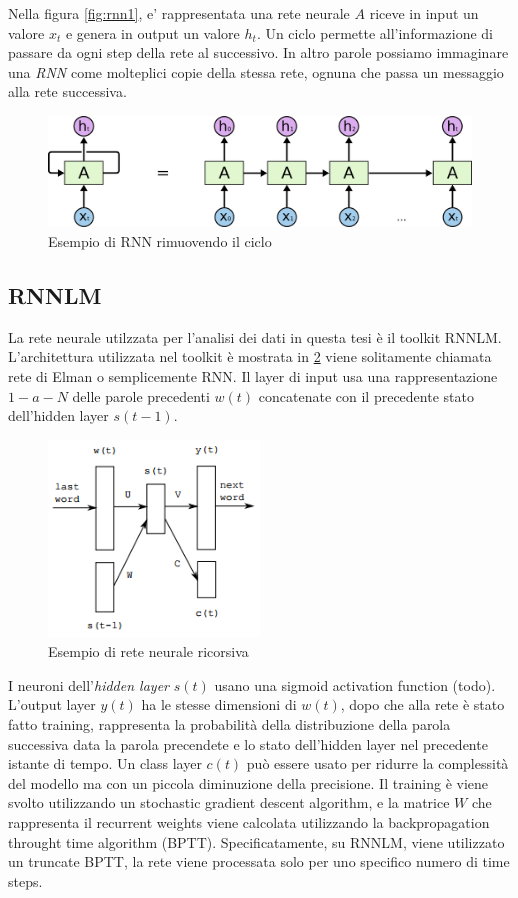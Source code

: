\documentclass[a4paper,12pt,openright,twoside]{report}
\theoremstyle{definition}
\begin{document}
Nella figura \ref{fig:rnn1}, e' rappresentata una rete neurale $A$ riceve in input un valore $x_t$ e genera in output un valore $h_t$.
Un ciclo permette all'informazione di passare da ogni step della rete al successivo. In altro parole possiamo immaginare
una \emph{RNN} come molteplici copie della stessa rete, ognuna che passa un messaggio alla rete successiva.

\begin{figure}[h]
	\centering
	\includegraphics[scale=0.3]{Immagini/rnn2.png}
	\caption{Esempio di RNN rimuovendo il ciclo}
	\label{fig:rnn2}
\end{figure}

\subsection{RNNLM}
La rete neurale utilzzata per l'analisi dei dati in questa tesi è il toolkit RNNLM. 
L'architettura utilizzata nel toolkit è mostrata in \ref{fig:rnnlm} viene solitamente chiamata rete di Elman o semplicemente RNN. Il layer di input usa una rappresentazione $1-a-N$ delle 
parole precedenti $w(t)$ concatenate con il precedente stato dell'hidden layer $s(t - 1)$.
\begin{figure}[h]
  \centering
      \includegraphics[width=0.5\textwidth]{Immagini/rnnlm_rete.png}
      \caption{Esempio di rete neurale ricorsiva}
\label{fig:rnnlm}
\end{figure}

I neuroni dell'\emph{hidden layer} $s(t)$ usano una sigmoid activation function (todo).
L'output layer $y(t)$ ha le stesse dimensioni di $w(t)$, dopo che alla rete è stato fatto training,
rappresenta la probabilità della distribuzione della parola successiva data la parola precendete 
e lo stato dell'hidden layer nel precedente istante di tempo.
Un class layer $c(t)$ può essere usato per ridurre la complessità del modello ma con un piccola
diminuzione della precisione.
Il training è viene svolto utilizzando un stochastic gradient descent algorithm, e la matrice $W$
che rappresenta il recurrent weights viene calcolata utilizzando la backpropagation throught time algorithm (BPTT).
Specificatamente, su RNNLM, viene utilizzato un truncate BPTT, la rete viene processata solo per uno specifico
numero di time steps.
\end{document}
